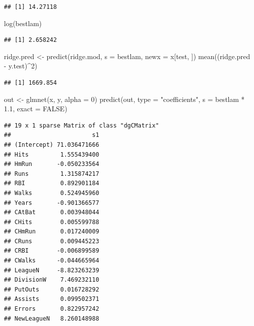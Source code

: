 \documentclass[
  12pt,
]{book}
\newenvironment{Shaded}{\begin{snugshade}}{\end{snugshade}}
\newcommand{\AttributeTok}[1]{\textcolor[rgb]{0.77,0.63,0.00}{#1}}
\newcommand{\ConstantTok}[1]{\textcolor[rgb]{0.00,0.00,0.00}{#1}}
\newcommand{\DecValTok}[1]{\textcolor[rgb]{0.00,0.00,0.81}{#1}}
\newcommand{\FloatTok}[1]{\textcolor[rgb]{0.00,0.00,0.81}{#1}}
\newcommand{\FunctionTok}[1]{\textcolor[rgb]{0.00,0.00,0.00}{#1}}
\newcommand{\NormalTok}[1]{#1}
\newcommand{\OtherTok}[1]{\textcolor[rgb]{0.56,0.35,0.01}{#1}}
\newcommand{\SpecialCharTok}[1]{\textcolor[rgb]{0.00,0.00,0.00}{#1}}
\newcommand{\StringTok}[1]{\textcolor[rgb]{0.31,0.60,0.02}{#1}}
\begin{document}
\begin{Shaded}
\end{Shaded}

\begin{verbatim}
## [1] 14.27118
\end{verbatim}

\begin{Shaded}
\begin{Highlighting}[]
\FunctionTok{log}\NormalTok{(bestlam)}
\end{Highlighting}
\end{Shaded}

\begin{verbatim}
## [1] 2.658242
\end{verbatim}

\begin{Shaded}
\begin{Highlighting}[]
\NormalTok{ridge.pred }\OtherTok{\textless{}{-}} \FunctionTok{predict}\NormalTok{(ridge.mod, }\AttributeTok{s =}\NormalTok{ bestlam, }\AttributeTok{newx =}\NormalTok{ x[test,}
\NormalTok{    ])}
\FunctionTok{mean}\NormalTok{((ridge.pred }\SpecialCharTok{{-}}\NormalTok{ y.test)}\SpecialCharTok{\^{}}\DecValTok{2}\NormalTok{)}
\end{Highlighting}
\end{Shaded}

\begin{verbatim}
## [1] 1669.854
\end{verbatim}

\begin{Shaded}
\begin{Highlighting}[]
\NormalTok{out }\OtherTok{\textless{}{-}} \FunctionTok{glmnet}\NormalTok{(x, y, }\AttributeTok{alpha =} \DecValTok{0}\NormalTok{)}
\FunctionTok{predict}\NormalTok{(out, }\AttributeTok{type =} \StringTok{"coefficients"}\NormalTok{, }\AttributeTok{s =}\NormalTok{ bestlam }\SpecialCharTok{*} \FloatTok{1.1}\NormalTok{,}
    \AttributeTok{exact =} \ConstantTok{FALSE}\NormalTok{)}
\end{Highlighting}
\end{Shaded}

\begin{verbatim}
## 19 x 1 sparse Matrix of class "dgCMatrix"
##                       s1
## (Intercept) 71.036471666
## Hits         1.555439400
## HmRun       -0.050233564
## Runs         1.315874217
## RBI          0.892901184
## Walks        0.524945960
## Years       -0.901366577
## CAtBat       0.003948044
## CHits        0.005599788
## CHmRun       0.017240009
## CRuns        0.009445223
## CRBI        -0.006899589
## CWalks      -0.044665964
## LeagueN     -8.823263239
## DivisionW    7.469232110
## PutOuts      0.016728292
## Assists      0.099502371
## Errors       0.822957242
## NewLeagueN   8.260148988
\end{verbatim}
\end{document}
